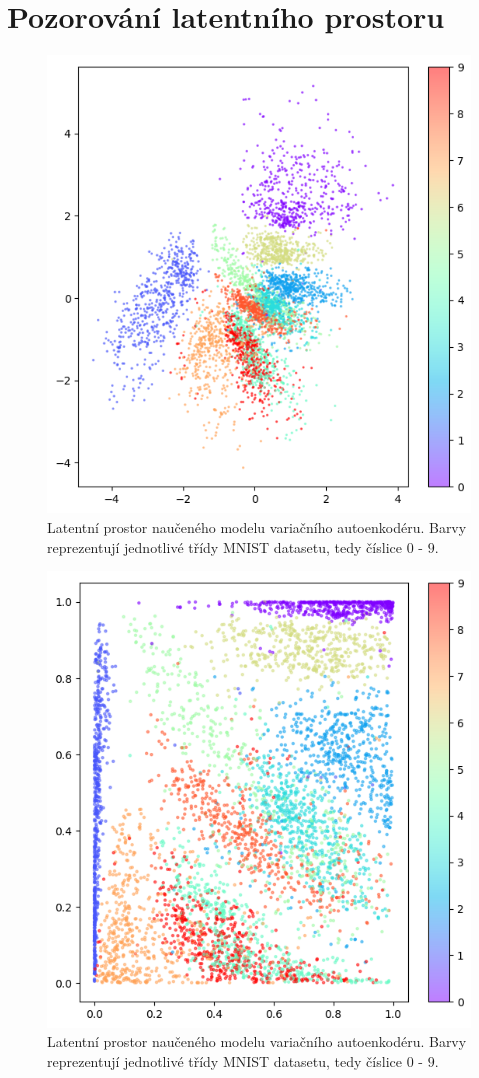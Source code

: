 \section{Pozorování latentního prostoru}
\label{sec:vae_model_latent_space_observation}

\begin{figure}[H]
    \centering
    \includegraphics[width=\textwidth]{figures/latent_space_200_epochs.png}
    \caption{Latentní prostor naučeného modelu variačního autoenkodéru. Barvy reprezentují jednotlivé třídy MNIST datasetu, tedy číslice $0$ - $9$. }
\end{figure}

\begin{figure}[H]
    \centering
    \includegraphics[width=\textwidth]{figures/vae_latent_space_p_values.png}
    \caption{Latentní prostor naučeného modelu variačního autoenkodéru. Barvy reprezentují jednotlivé třídy MNIST datasetu, tedy číslice $0$ - $9$. }
\end{figure}
